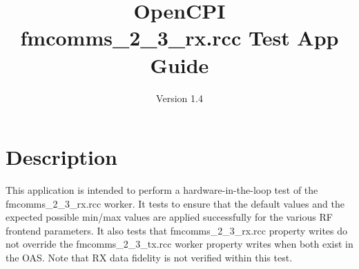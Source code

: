 \iffalse
This file is protected by Copyright. Please refer to the COPYRIGHT file
distributed with this source distribution.

This file is part of OpenCPI <http://www.opencpi.org>

OpenCPI is free software: you can redistribute it and/or modify it under the
terms of the GNU Lesser General Public License as published by the Free Software
Foundation, either version 3 of the License, or (at your option) any later
version.

OpenCPI is distributed in the hope that it will be useful, but WITHOUT ANY
WARRANTY; without even the implied warranty of MERCHANTABILITY or FITNESS FOR A
PARTICULAR PURPOSE. See the GNU Lesser General Public License for more details.

You should have received a copy of the GNU Lesser General Public License along
with this program. If not, see <http://www.gnu.org/licenses/>.
\fi

\def\docTitle{OpenCPI\\ fmcomms\_2\_3\_rx.rcc Test App Guide}
\def\docVersion{1.4}

\date{Version \docVersion} %
\title{\docTitle}
\usepackage{graphicx}
\graphicspath{ {figures/} }
\usepackage{textcomp}
\usepackage{listings}


\maketitle

\section{Description}
This application is intended to perform a hardware-in-the-loop test of the fmcomms\_2\_3\_rx.rcc worker. It tests to ensure that the default values and the expected possible min/max values are applied successfully for the various RF frontend parameters. It also tests that fmcomms\_2\_3\_rx.rcc property writes do not override the fmcomms\_2\_3\_tx.rcc worker property writes when both exist in the OAS. Note that RX data fidelity is not verified within this test.

